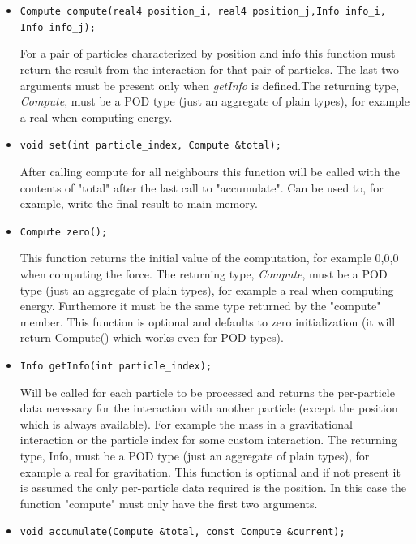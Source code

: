 \documentclass[ twoside,openright,titlepage,numbers=noenddot,%
headinclude,footinclude,cleardoublepage=empty,abstract=on,
BCOR=5mm,paper=b5,fontsize=11pt, dvipsnames
]{scrreprt}
\def\ucpp{uammd_cpp_lexer.py:UAMMDCppLexer -x}
\begin{document}
\begin{itemize}
\item \texttt{Compute compute(real4 position_i, real4 position_j,Info info_i, Info info_j);}

  
  For a pair of particles
  characterized by position and info this function must return the
  result from the interaction for that pair of particles. The last
  two arguments must be present only when \emph{getInfo} is defined.The
  returning type, \emph{Compute}, must be a POD type (just an aggregate of
  plain types), for example a real when computing energy.

\item \texttt{void set(int particle_index, Compute &total);}

  
   After calling compute for all neighbours this function will be called with the contents of "total" after the last call to "accumulate".
   Can be used to, for example, write the final result to main memory.

 \item \texttt{Compute zero();}

   
   This function returns the initial value of the computation, for example {0,0,0} when computing the force. 
   The returning type, \emph{Compute}, must be a POD type (just an aggregate of plain types), for example a real when computing energy. Furthemore it must be the same type returned by the "compute" member.
   This function is optional and defaults to zero initialization (it will return Compute() which works even for POD types).
    
 \item \texttt{Info getInfo(int particle_index);}

   
   Will be called for each particle to be processed and returns the per-particle data necessary for the interaction with another particle (except the position which is always available). For example the mass in a gravitational interaction or the particle index for some custom interaction.
   The returning type, Info, must be a POD type (just an aggregate of plain types), for example a real for gravitation.
   This function is optional and if not present it is assumed the only per-particle data required is the position. 
   In this case the function "compute" must only have the first two arguments.

 \item \texttt{void accumulate(Compute &total, const Compute &current);}


\end{itemize}
\end{document}
